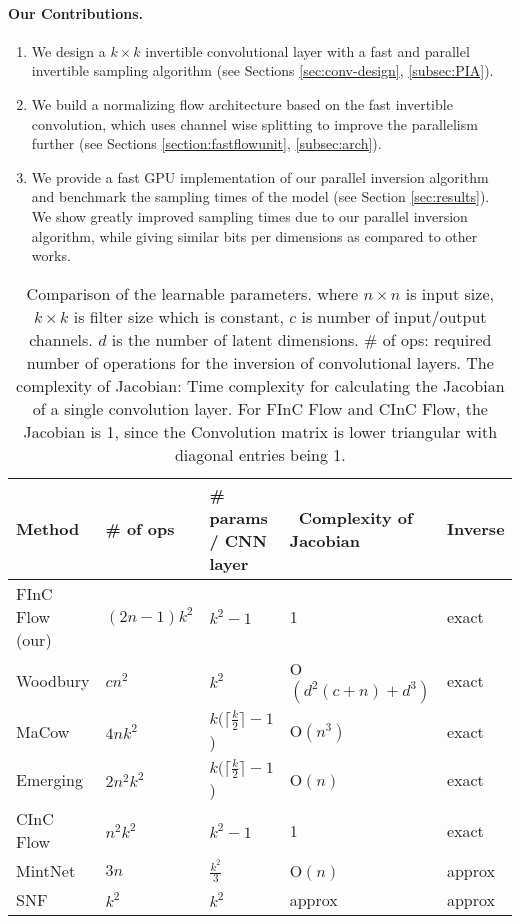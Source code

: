 \documentclass[a4paper,twoside]{article}
\theoremstyle{definition}
\begin{document}
\paragraph{Our Contributions.}
\begin{enumerate}
    \item We design a $k\times k$ invertible convolutional layer with a fast and parallel invertible sampling algorithm (see Sections \ref{sec:conv-design}, \ref{subsec:PIA}).
    \item We build a normalizing flow architecture based on the fast invertible convolution, which uses channel wise splitting to improve the parallelism further (see Sections \ref{section:fastflowunit}, \ref{subsec:arch}).
    \item We provide a fast GPU implementation of our parallel inversion algorithm and benchmark the sampling times of the model (see Section \ref{sec:results}). We show greatly improved sampling times due to our parallel inversion algorithm, while giving similar bits per dimensions as compared to other works.
\end{enumerate}
 
\begin{table*}[!t]
    \centering
    \begin{tabular}{l  l  l  l  l }
        \toprule
        Method    & \# of ops & \# params / CNN layer & \ Complexity of Jacobian & Inverse\\ 
        \midrule
        FInC Flow (our)  &    $(2n-1)k^2$ & $k^2 - 1$    & 1 &     exact   \\
        Woodbury \citep{lu2020woodbury} & $cn^2$ & $k^2$ & O$(d^2(c + n) + d^3)$ & exact \\
        MaCow \citep{ma2019macow}     &  $4nk^2$   & $k( \lceil \frac{k}{2} \rceil -1$) &  O$(n^3)$ & exact\\ 
        Emerging \citep{hoogeboom2019emerging}  &  $2n^2k^2$ &  $k( \lceil \frac{k}{2} \rceil -1$)  &  O$(n)$  &    exact   \\
        CInC Flow \citep{nagar2021cinc}  &  $n^2 k^2$   & $k^2 - 1$    & 1  &   exact      \\
        \midrule
        MintNet   \citep{song2019mintnet} &  $3n$   &  $ \frac{k^2}{3}$   &  O$(n)$ &    approx  \\ 
        SNF  \citep{keller2021self} &   $k^2$   &  $k^2$  &  approx &  approx \\ \bottomrule
    \end{tabular}
    \caption{Comparison of the learnable parameters. where $ n \times n $ is input size, $k \times k$ is filter size which is constant, $c$ is number of input/output channels. $d$ is the number of latent dimensions. \# of ops: required number of operations for the inversion of convolutional layers. The complexity of Jacobian: Time complexity for calculating the Jacobian of a single convolution layer. For FInC Flow and CInC Flow, the Jacobian is 1, since the Convolution matrix is lower triangular with diagonal entries being 1.}
    \label{table:complexity}
\end{table*}
\end{document}
